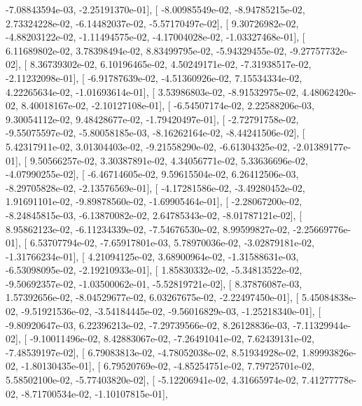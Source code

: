 \documentclass{article}
\begin{document}
         -7.08843594e-03,  -2.25191370e-01],
       [ -8.00985549e-02,  -8.94785215e-02,   2.73324228e-02,
         -6.14482037e-02,  -5.57170497e-02],
       [  9.30726982e-02,  -4.88203122e-02,  -1.11494575e-02,
         -4.17004028e-02,  -1.03327468e-01],
       [  6.11689802e-02,   3.78398494e-02,   8.83499795e-02,
         -5.94329455e-02,  -9.27757732e-02],
       [  8.36739302e-02,   6.10196465e-02,   4.50249171e-02,
         -7.31938517e-02,  -2.11232098e-01],
       [ -6.91787639e-02,  -4.51360926e-02,   7.15534334e-02,
          4.22265634e-02,  -1.01693614e-01],
       [  3.53986803e-02,  -8.91532975e-02,   4.48062420e-02,
          8.40018167e-02,  -2.10127108e-01],
       [ -6.54507174e-02,   2.22588206e-03,   9.30054112e-02,
          9.48428677e-02,  -1.79420497e-01],
       [ -2.72791758e-02,  -9.55075597e-02,  -5.80058185e-03,
         -8.16262164e-02,  -8.44241506e-02],
       [  5.42317911e-02,   3.01304403e-02,  -9.21558290e-02,
         -6.61304325e-02,  -2.01389177e-01],
       [  9.50566257e-02,   3.30387891e-02,   4.34056771e-02,
          5.33636696e-02,  -4.07990255e-02],
       [ -6.46714605e-02,   9.59615504e-02,   6.26412506e-03,
         -8.29705828e-02,  -2.13576569e-01],
       [ -4.17281586e-02,  -3.49280452e-02,   1.91691101e-02,
         -9.89878560e-02,  -1.69905464e-01],
       [ -2.28067200e-02,  -8.24845815e-03,  -6.13870082e-02,
          2.64785343e-02,  -8.01787121e-02],
       [  8.95862123e-02,  -6.11234339e-02,  -7.54676530e-02,
          8.99599827e-02,  -2.25669776e-01],
       [  6.53707794e-02,  -7.65917801e-03,   5.78970036e-02,
         -3.02879181e-02,  -1.31766234e-01],
       [  4.21094125e-02,   3.68900964e-02,  -1.31588631e-03,
         -6.53098095e-02,  -2.19210933e-01],
       [  1.85830332e-02,  -5.34813522e-02,  -9.50692357e-02,
         -1.03500062e-01,  -5.52819721e-02],
       [  8.37876087e-03,   1.57392656e-02,  -8.04529677e-02,
          6.03267675e-02,  -2.22497450e-01],
       [  5.45084838e-02,  -9.51921536e-02,  -3.54184445e-02,
         -9.56016829e-03,  -1.25218340e-01],
       [ -9.80920647e-03,   6.22396213e-02,  -7.29739566e-02,
          8.26128836e-03,  -7.11329944e-02],
       [ -9.10011496e-02,   8.42883067e-02,  -7.26491041e-02,
          7.62439131e-02,  -7.48539197e-02],
       [  6.79083813e-02,  -4.78052038e-02,   8.51934928e-02,
          1.89993826e-02,  -1.80130435e-01],
       [  6.79520769e-02,  -4.85254751e-02,   7.79725701e-02,
          5.58502100e-02,  -5.77403820e-02],
       [ -5.12206941e-02,   4.31665974e-02,   7.41277778e-02,
         -8.71700534e-02,  -1.10107815e-01],
\end{document}
